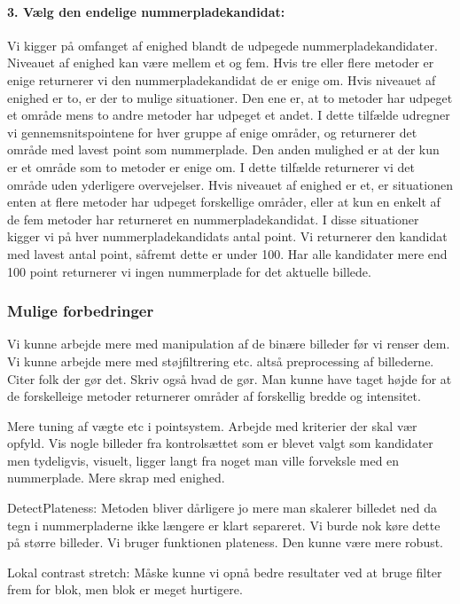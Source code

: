 \paragraph{3. Vælg den endelige nummerpladekandidat:}
Vi kigger på omfanget af enighed blandt de udpegede nummerpladekandidater. Niveauet af enighed kan være mellem et og fem. Hvis tre eller flere metoder er enige returnerer vi den nummerpladekandidat de er enige om. Hvis niveauet af enighed er to, er der to mulige situationer. Den ene er, at to metoder har udpeget et område mens to andre metoder har udpeget et andet. I dette tilfælde udregner vi gennemsnitspointene for hver gruppe af enige områder, og returnerer det område med lavest point som nummerplade. Den anden mulighed er at der kun er et område som to metoder er enige om. I dette tilfælde returnerer vi det område uden yderligere overvejelser. Hvis niveauet af enighed er et, er situationen enten at flere metoder har udpeget forskellige områder, eller at kun en enkelt af de fem metoder har returneret en nummerpladekandidat. I disse situationer kigger vi på hver nummerpladekandidats antal point. Vi returnerer den kandidat med lavest antal point, såfremt dette er under 100. Har alle kandidater mere end 100 point returnerer vi ingen nummerplade for det aktuelle billede.

\subsubsection{Mulige forbedringer}
Vi kunne arbejde mere med manipulation af de binære billeder før vi renser dem. Vi kunne arbejde mere med støjfiltrering etc. altså preprocessing af billederne. Citer folk der gør det. Skriv også hvad de gør.
Man kunne have taget højde for at de forskelleige metoder returnerer områder af forskellig bredde og intensitet.

Mere tuning af vægte etc i pointsystem. Arbejde med kriterier der skal vær opfyld. Vis nogle billeder fra kontrolsættet som er blevet valgt som kandidater men tydeligvis, visuelt, ligger langt fra noget man ville forveksle med en nummerplade. Mere skrap med enighed.


DetectPlateness:
Metoden bliver dårligere jo mere man skalerer billedet ned da tegn i nummerpladerne ikke længere er klart separeret. Vi burde nok køre dette på større billeder.
Vi bruger funktionen plateness. Den kunne være mere robust.

Lokal contrast stretch:
Måske kunne vi opnå bedre resultater ved at bruge filter frem for blok, men blok er meget hurtigere.

